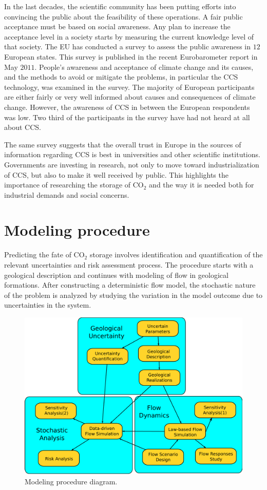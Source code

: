 In the last decades, the scientific community has been putting efforts into
convincing the public about the feasibility of these operations. A fair public acceptance must be based on social awareness. Any plan to increase the
acceptance level in a society starts by measuring the current knowledge level of that society. The EU has conducted a survey to assess the public awareness in $12$ European states. This survey is published in the recent Eurobarometer report in May $2011$. People's awareness and acceptance of climate change and its causes, and the methods to avoid or mitigate the problems, in particular the CCS technology, was examined in the survey. The majority of European participants are either fairly or very well informed about causes and consequences of climate change. However, the awareness of CCS in between the European respondents was low. Two third of the participants in the survey have had not heard at all about CCS. 

The same survey suggests that the overall trust in Europe in the sources of
information regarding  CCS is best in universities and other scientific
institutions. Governments are investing in research, not only to move toward
industrialization of CCS, but also to make it well received by public. This
highlights the importance of researching the storage of $\mbox{CO}_2$ and the
way it is needed both for industrial demands and social concerns.

\section{Modeling procedure}
\label{sec:MProcedure}

Predicting the fate of $\mbox{CO}_2$ storage involves identification and
quantification of the  relevant uncertainties and risk assessment process. The
procedure starts with a geological description and continues with modeling of
flow in geological formations. After constructing a deterministic flow model,
the stochastic nature of the problem is analyzed by studying the variation in
the model outcome due to uncertainties in the system. 

\begin{figure}
  \center
  \includegraphics[width=0.95 \linewidth]{./figurer/prc3}
  \caption{Modeling procedure diagram.}
  \label{fig:prc}
%
\end{figure}

